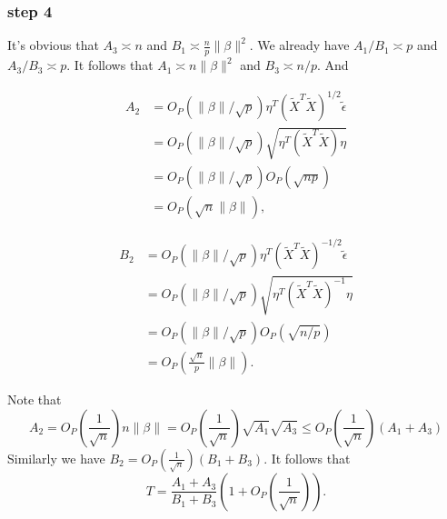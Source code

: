 \documentclass[review]{elsarticle}
\theoremstyle{plain}
\theoremstyle{definition}
\theoremstyle{remark}
\begin{document}
\subsubsection{step 4}
It's obvious that $A_3\asymp n$ and $B_1\asymp \frac{n}{p}\|\beta\|^2$. We already have $A_1/B_1\asymp p$ and $A_3/B_3\asymp p$. It follows that $A_1\asymp n\|\beta\|^2$ and $B_3\asymp n/p$. And

\begin{equation}
    \begin{aligned}
        A_2&=O_P(\|\beta\|/{\sqrt{p}})\eta^T {(\tilde{X}^T\tilde{X})}^{1/2}\tilde{\epsilon}\\
        &=O_P(\|\beta\|/\sqrt{p})\sqrt{\eta^T{(\tilde{X}^T\tilde{X})}\eta}\\
        &=O_P(\|\beta\|/\sqrt{p})O_P(\sqrt{np})\\
        &=O_P(\sqrt{n}\|\beta\|),
    \end{aligned}
\end{equation}

\begin{equation}
    \begin{aligned}
        B_2&=O_P(\|\beta\|/{\sqrt{p}})\eta^T {(\tilde{X}^T\tilde{X})}^{-1/2}\tilde{\epsilon}\\
        &=O_P(\|\beta\|/\sqrt{p})\sqrt{\eta^T{(\tilde{X}^T\tilde{X})}^{-1}\eta}\\
        &=O_P(\|\beta\|/\sqrt{p})O_P(\sqrt{n/p})\\
        &=O_P(\frac{\sqrt{n}}{p}\|\beta\|).
    \end{aligned}
\end{equation}

Note that 
\begin{equation}
A_2=O_P(\frac{1}{\sqrt{n}})n\|\beta\|=O_P(\frac{1}{\sqrt{n}})\sqrt{A_1}\sqrt{A_3}
        \leq O_P(\frac{1}{\sqrt{n}})(A_1+A_3)
\end{equation}
Similarly we have $B_2=O_P(\frac{1}{\sqrt{n}})(B_1+B_3)$. It follows that
\begin{equation}\label{TAB}
    T=\frac{A_1+A_3}{B_1+B_3}(1+O_P(\frac{1}{\sqrt{n}})).
\end{equation}
\end{document}
